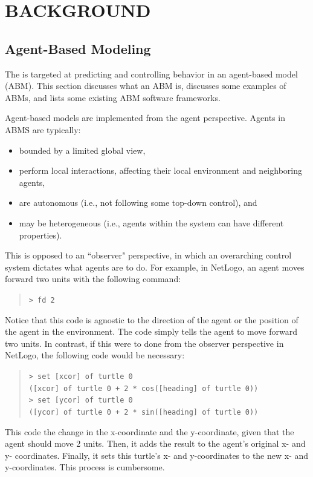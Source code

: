 \chapter{BACKGROUND}
\thispagestyle{plain}

\label{Background}

\section{Agent-Based Modeling}
The \framework is targeted at predicting and controlling behavior in an agent-based model (ABM).
This section discusses what an ABM is, discusses some examples of ABMs, and lists some existing ABM software frameworks.

Agent-based models are implemented from the agent perspective.
Agents in ABMS are typically:
\begin{itemize}
   \item bounded by a limited global view,
   \item perform local interactions, affecting their local environment and neighboring agents,
   \item are autonomous (i.e., not following some top-down control), and
   \item may be heterogeneous (i.e., agents within the system can have different properties).
\end{itemize}\cite{epstein1999agent}
This is opposed to an ``observer" perspective, in which an overarching control system dictates what agents are to do.
For example, in NetLogo, an agent moves forward two units with the following command:
\begin{quote}
\texttt{\small > fd 2}
\end{quote}
Notice that this code is agnostic to the direction of the agent or the position of the agent in the environment.
The code simply tells the agent to move forward two units.
In contrast, if this were to done from the observer perspective in NetLogo, the following code would be necessary:
\begin{quote}
\texttt{\small > set [xcor] of turtle 0\\
([xcor] of turtle 0 + 2 * cos([heading] of turtle 0))\\
> set [ycor] of turtle 0\\
([ycor] of turtle 0 + 2 * sin([heading] of turtle 0))}
\end{quote}
This code the change in the x-coordinate and the y-coordinate, given that the agent should move 2 units.
Then, it adds the result to the agent's original x- and y- coordinates.
Finally, it sets this turtle's x- and y-coordinates to the new x- and y-coordinates.
This process is cumbersome.

